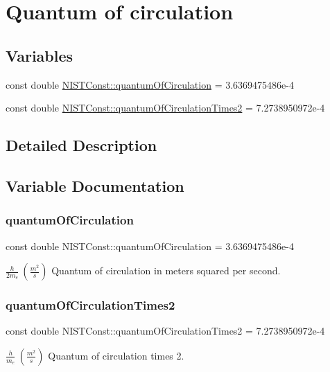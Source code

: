 \hypertarget{group___quantum_of_circulation}{}\section{Quantum of circulation}
\label{group___quantum_of_circulation}
\subsection*{Variables}
\begin{DoxyCompactItemize}
\item 
const double \hyperlink{group___quantum_of_circulation_ga7dbe55704b9a968adfc99d60f5d2dd11}{N\+I\+S\+T\+Const\+::quantum\+Of\+Circulation} = 3.\+6369475486e-\/4
\item 
const double \hyperlink{group___quantum_of_circulation_ga86d150a3f178c37f565f6498cf593dbe}{N\+I\+S\+T\+Const\+::quantum\+Of\+Circulation\+Times2} = 7.\+2738950972e-\/4
\end{DoxyCompactItemize}


\subsection{Detailed Description}


\subsection{Variable Documentation}
\mbox{\label{group___quantum_of_circulation_ga7dbe55704b9a968adfc99d60f5d2dd11}} 
\subsubsection{\texorpdfstring{quantum\+Of\+Circulation}{quantumOfCirculation}}
{\footnotesize\ttfamily const double N\+I\+S\+T\+Const\+::quantum\+Of\+Circulation = 3.\+6369475486e-\/4}

$\frac{h}{2 m_e} \ (\frac{m^2}{s})$ Quantum of circulation in meters squared per second. \mbox{\label{group___quantum_of_circulation_ga86d150a3f178c37f565f6498cf593dbe}} 
\subsubsection{\texorpdfstring{quantum\+Of\+Circulation\+Times2}{quantumOfCirculationTimes2}}
{\footnotesize\ttfamily const double N\+I\+S\+T\+Const\+::quantum\+Of\+Circulation\+Times2 = 7.\+2738950972e-\/4}

$\frac{h}{m_e} \ (\frac{m^2}{s})$ Quantum of circulation times 2. 